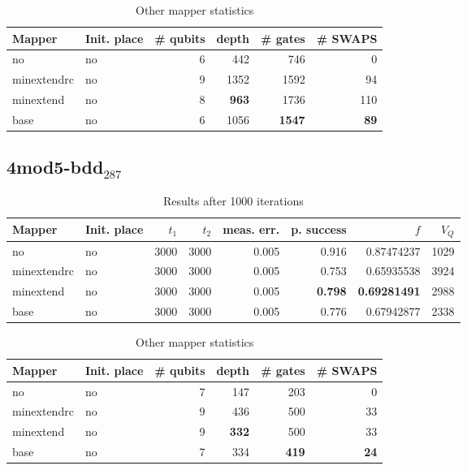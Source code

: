 \documentclass[11pt]{article}
\begin{document}
\begin{table}[!htpb]
\caption{\label{tab:org3534fb5}
Other mapper statistics}
\centering
\small
\begin{tabular}{llrrrr}
\hline
Mapper & Init. place & \# qubits & depth & \# gates & \# SWAPS\\
\hline
no & no & 6 & 442 & 746 & 0\\
\hline
minextendrc & no & 9 & 1352 & 1592 & 94\\
minextend & no & 8 & \textbf{963} & 1736 & 110\\
base & no & 6 & 1056 & \textbf{1547} & \textbf{89}\\
\hline
\end{tabular}
\end{table}

\subsection{4mod5-bdd\(_{\text{287}}\)}
\label{sec:orge160baf}
\begin{table}[!htpb]
\caption{\label{tab:org7e496d8}
Results after 1000 iterations}
\centering
\begin{tabular}{llrrrrrr}
\hline
Mapper & Init. place & \(t_1\) & \(t_2\) & meas. err. & p. success & \(f\) & \(V_Q\)\\
\hline
no & no & 3000 & 3000 & 0.005 & 0.916 & 0.87474237 & 1029\\
\hline
minextendrc & no & 3000 & 3000 & 0.005 & 0.753 & 0.65935538 & 3924\\
minextend & no & 3000 & 3000 & 0.005 & \textbf{0.798} & \textbf{0.69281491} & 2988\\
base & no & 3000 & 3000 & 0.005 & 0.776 & 0.67942877 & 2338\\
\hline
\end{tabular}
\end{table}


\begin{table}[!htpb]
\caption{\label{tab:orga8efcfb}
Other mapper statistics}
\centering
\small
\begin{tabular}{llrrrr}
\hline
Mapper & Init. place & \# qubits & depth & \# gates & \# SWAPS\\
\hline
no & no & 7 & 147 & 203 & 0\\
\hline
minextendrc & no & 9 & 436 & 500 & 33\\
minextend & no & 9 & \textbf{332} & 500 & 33\\
base & no & 7 & 334 & \textbf{419} & \textbf{24}\\
\hline
\end{tabular}
\end{table}
\end{document}

